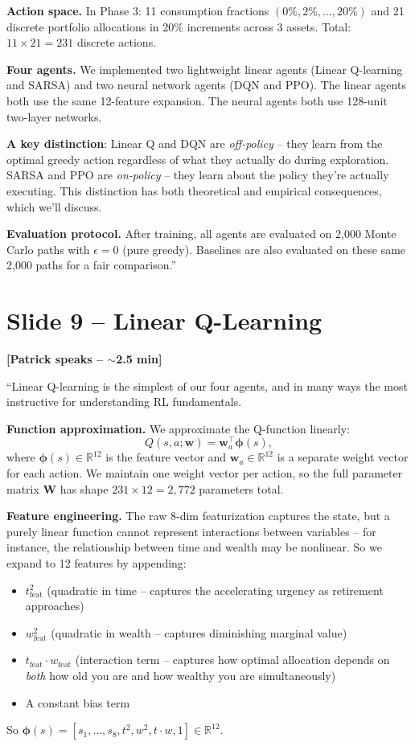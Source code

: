 \documentclass[11pt, letterpaper]{article}
\begin{document}
\textbf{Action space.} In Phase 3: 11 consumption fractions $(0\%, 2\%, \ldots, 20\%)$ and 21 discrete portfolio allocations in 20\% increments across 3 assets. Total: $11 \times 21 = 231$ discrete actions.

\textbf{Four agents.} We implemented two lightweight linear agents (Linear Q-learning and SARSA) and two neural network agents (DQN and PPO). The linear agents both use the same 12-feature expansion. The neural agents both use 128-unit two-layer networks.

\textbf{A key distinction}: Linear Q and DQN are \emph{off-policy} -- they learn from the optimal greedy action regardless of what they actually do during exploration. SARSA and PPO are \emph{on-policy} -- they learn about the policy they're actually executing. This distinction has both theoretical and empirical consequences, which we'll discuss.

\textbf{Evaluation protocol.} After training, all agents are evaluated on 2,000 Monte Carlo paths with $\epsilon = 0$ (pure greedy). Baselines are also evaluated on these same 2,000 paths for a fair comparison.''

\section{Slide 9 -- Linear Q-Learning}

\textbf{[Patrick speaks -- $\sim$2.5 min]}

``Linear Q-learning is the simplest of our four agents, and in many ways the most instructive for understanding RL fundamentals.

\textbf{Function approximation.} We approximate the Q-function linearly:
\[
Q(s, a; \mathbf{w}) = \mathbf{w}_a^\top \boldsymbol{\phi}(s),
\]
where $\boldsymbol{\phi}(s) \in \mathbb{R}^{12}$ is the feature vector and $\mathbf{w}_a \in \mathbb{R}^{12}$ is a separate weight vector for each action. We maintain one weight vector per action, so the full parameter matrix $\mathbf{W}$ has shape $231 \times 12 = 2{,}772$ parameters total.

\textbf{Feature engineering.} The raw 8-dim featurization captures the state, but a purely linear function cannot represent interactions between variables -- for instance, the relationship between time and wealth may be nonlinear. So we expand to 12 features by appending:
\begin{itemize}
\item $t_{\text{feat}}^2$ (quadratic in time -- captures the accelerating urgency as retirement approaches)
\item $w_{\text{feat}}^2$ (quadratic in wealth -- captures diminishing marginal value)
\item $t_{\text{feat}} \cdot w_{\text{feat}}$ (interaction term -- captures how optimal allocation depends on \emph{both} how old you are and how wealthy you are simultaneously)
\item A constant bias term
\end{itemize}
So $\boldsymbol{\phi}(s) = [s_1, \ldots, s_8, t^2, w^2, t \cdot w, 1] \in \mathbb{R}^{12}$.
\end{document}
